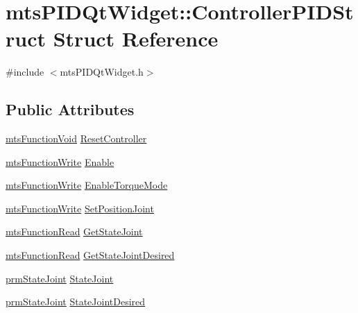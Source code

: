 \hypertarget{structmts_p_i_d_qt_widget_1_1_controller_p_i_d_struct}{\section{mts\-P\-I\-D\-Qt\-Widget\-:\-:Controller\-P\-I\-D\-Struct Struct Reference}
\label{structmts_p_i_d_qt_widget_1_1_controller_p_i_d_struct}
}


{\ttfamily \#include $<$mts\-P\-I\-D\-Qt\-Widget.\-h$>$}

\subsection*{Public Attributes}
\begin{DoxyCompactItemize}
\item 
\hyperlink{classmts_function_void}{mts\-Function\-Void} \hyperlink{structmts_p_i_d_qt_widget_1_1_controller_p_i_d_struct_acc0f8f2adcb5819d0108d44c8d97f099}{Reset\-Controller}
\item 
\hyperlink{classmts_function_write}{mts\-Function\-Write} \hyperlink{structmts_p_i_d_qt_widget_1_1_controller_p_i_d_struct_a38d32885e2d0d48ed755d84d1a964ecc}{Enable}
\item 
\hyperlink{classmts_function_write}{mts\-Function\-Write} \hyperlink{structmts_p_i_d_qt_widget_1_1_controller_p_i_d_struct_a2dc1bec91e3de953ec4aa58722e082a9}{Enable\-Torque\-Mode}
\item 
\hyperlink{classmts_function_write}{mts\-Function\-Write} \hyperlink{structmts_p_i_d_qt_widget_1_1_controller_p_i_d_struct_a23f008fc730468d980666ac2dbc5dd00}{Set\-Position\-Joint}
\item 
\hyperlink{classmts_function_read}{mts\-Function\-Read} \hyperlink{structmts_p_i_d_qt_widget_1_1_controller_p_i_d_struct_a5d9dad115f5fa35d03bb6d83365be86e}{Get\-State\-Joint}
\item 
\hyperlink{classmts_function_read}{mts\-Function\-Read} \hyperlink{structmts_p_i_d_qt_widget_1_1_controller_p_i_d_struct_aab811dc001db6d49d1ff1c45cc04ab75}{Get\-State\-Joint\-Desired}
\item 
\hyperlink{classprm_state_joint}{prm\-State\-Joint} \hyperlink{structmts_p_i_d_qt_widget_1_1_controller_p_i_d_struct_ae51e77265c3f6e4c8b57179233281791}{State\-Joint}
\item 
\hyperlink{classprm_state_joint}{prm\-State\-Joint} \hyperlink{structmts_p_i_d_qt_widget_1_1_controller_p_i_d_struct_a9c98f4604d3ba17c2ce0d1bd17bcf083}{State\-Joint\-Desired}

\end{DoxyCompactItemize}

